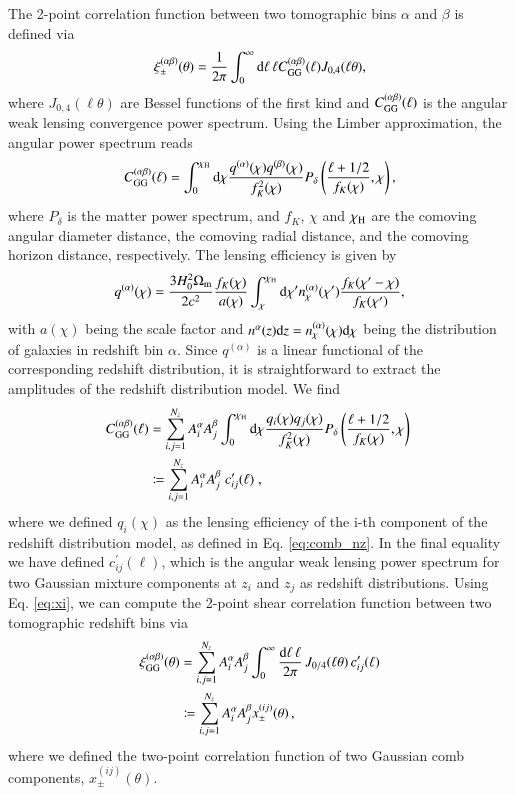 \documentclass{aa}
\newcommand{\eq}[1]{\begin{equation}  #1 \end{equation}}
\newcommand{\eqa}[1]{\begin{align}   #1 \end{align}}
\newcommand{\br}[1]{\left( #1 \right)}
\newcommand{\dd}{{\rm d}}
\begin{document}
The 2-point correlation function between two tomographic bins $\alpha$ and $\beta$ is defined via
\eq{
\label{eq:xi}
\xi_\pm^{(\alpha\beta)}(\theta) = \frac{1}{2\pi}\int_0^{\infty}{\rm d}\ell\, \ell C_{\rm GG}^{(\alpha\beta)}(\ell)J_{0,4}(\ell\theta),
}
where $J_{0,4}(\ell\theta)$ are Bessel functions of the first kind and $C_{\rm GG}^{(\alpha\beta)}(\ell)$ is the angular weak lensing convergence power spectrum.
Using the Limber approximation, the angular power spectrum reads \citep{kaiser92}
\eq{
C_{\rm GG}^{(\alpha \beta)}(\ell) = \int_0^{\chi_{\rm H}} \dd \chi \frac{q^{(\alpha)}(\chi) q^{(\beta)}(\chi)}{f_K^2(\chi)} P_\delta\br{\frac{\ell+1/2}{f_K(\chi)},\chi},
}
where $P_\delta$ is the matter power spectrum, and $f_K$, $\chi$ and $\chi_{\rm H}$ are the comoving angular diameter distance, the comoving radial distance, and the comoving horizon distance, respectively. The lensing efficiency is given by
\eq{
q^{(\alpha)}(\chi) = \frac{3H_0^2\Omega_{\rm m}}{2c^2} \frac{f_K(\chi)}{a({\chi})} \int_\chi^{\chi_{\rm H}} \dd \chi^\prime n_\chi^{(\alpha)}(\chi') \frac{f_K(\chi^\prime-\chi)}{f_K(\chi^\prime)},
}
with $a(\chi)$ being the scale factor and $n^\alpha(z){\rm d}z = n_\chi^{(\alpha)}(\chi){\rm d}\chi$ being the distribution of galaxies in redshift bin $\alpha$. Since $q^{(\alpha)}$ is a linear functional of the corresponding redshift distribution, it is straightforward to extract the amplitudes of the redshift distribution model. We find
\eqa{
C_{\rm GG}^{(\alpha \beta)}(\ell) &= \sum_{i,j=1}^{N_z} A_i^\alpha A_j^\beta \int_0^{\chi_{\rm H}} \dd \chi \frac{q_i(\chi) q_j(\chi)}{f_K^2(\chi)} P_\delta\br{\frac{\ell+1/2}{f_K(\chi)},\chi}\;\\
&\coloneqq \sum_{i,j=1}^{N_z} A_i^\alpha A_j^\beta\; c^\prime_{ij}(\ell)\;,
}
where we defined $q_i(\chi)$ as the lensing efficiency of the i-th component of the redshift distribution model, as defined in Eq. \eqref{eq:comb_nz}. In the final equality we have defined $c^\prime_{ij}(\ell)$, which is the angular weak lensing power spectrum for two Gaussian mixture components at $z_i$ and $z_j$ as redshift distributions. Using Eq. \eqref{eq:xi}, we can compute the 2-point shear correlation function between two tomographic redshift bins via
\eqa{
\xi_{\rm GG}^{(\alpha\beta)}(\theta) &= \sum_{i,j=1}^{N_z} A_i^\alpha A_j^\beta \int_0^\infty \frac{\dd \ell\, \ell}{2 \pi}\,J _{0/4}(\ell \theta)\, c^\prime_{ij}(\ell)\\
&\coloneqq  \sum_{i,j=1}^{N_z} A_i^\alpha A_j^\beta x_\pm^{(ij)}(\theta)\, ,\label{eq:xi_comb}
}
where we defined the two-point correlation function of two Gaussian comb components, $x_\pm^{(ij)}(\theta)$.
\end{document}
